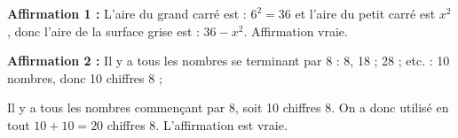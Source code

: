 
\medskip

%

\textbf{Affirmation 1 :} %
L'aire du grand carré est : $6^2 = 36$ et l'aire du petit carré est $x^2$, donc l'aire de la surface grise est : $36 - x^2$. Affirmation vraie.


\textbf{Affirmation 2 :} %
Il y a tous les nombres se terminant par 8 : 8, 18 ; 28 ; etc. : 10 nombres, donc 10 chiffres 8 ;

Il y a tous les nombres commençant par 8,  soit 10 chiffres 8. On a donc utilisé en tout $10 + 10 = 20$ chiffres 8. L'affirmation est vraie.

\vspace{0,5cm}

